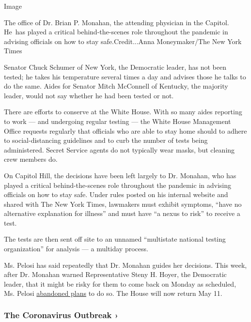 Image

The office of Dr. Brian P. Monahan, the attending physician in the
Capitol. He~has played a critical behind-the-scenes role throughout the
pandemic in advising officials on how to stay safe.Credit...Anna
Moneymaker/The New York Times

Senator Chuck Schumer of New York, the Democratic leader, has not been
tested; he takes his temperature several times a day and advises those
he talks to do the same. Aides for Senator Mitch McConnell of Kentucky,
the majority leader, would not say whether he had been tested or not.

There are efforts to conserve at the White House. With so many aides
reporting to work --- and undergoing regular testing --- the White House
Management Office requests regularly that officials who are able to stay
home should to adhere to social-distancing guidelines and to curb the
number of tests being administered. Secret Service agents do not
typically wear masks, but cleaning crew members do.

On Capitol Hill, the decisions have been left largely to Dr. Monahan,
who has played a critical behind-the-scenes role throughout the pandemic
in advising officials on how to stay safe. Under rules posted on his
internal website and shared with The New York Times, lawmakers must
exhibit symptoms, ``have no alternative explanation for illness'' and
must have ``a nexus to risk'' to receive a test.

The tests are then sent off site to an unnamed ``multistate national
testing organization'' for analysis --- a multiday process.

Ms. Pelosi has said repeatedly that Dr. Monahan guides her decisions.
This week, after Dr. Monahan warned Representative Steny H. Hoyer, the
Democratic leader, that it might be risky for them to come back on
Monday as scheduled, Ms. Pelosi
\href{https://www.nytimes.com/2020/04/28/us/politics/house-return-coronavirus.html}{abandoned
plans} to do so. The House will now return May 11.

\href{https://www.nytimes.com/news-event/coronavirus?action=click\&pgtype=Article\&state=default\&region=MAIN_CONTENT_3\&context=storylines_faq}{}

\hypertarget{the-coronavirus-outbreak-}{%
\subsubsection{The Coronavirus Outbreak
›}\label{the-coronavirus-outbreak-}}

